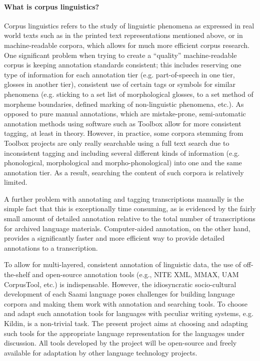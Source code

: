 \documentclass[a4paper,12pt]{article}
\begin{document}
\paragraph{What is corpus linguistics?} Corpus linguistics refers to the study of linguistic phenomena as expressed in real world texts such as in the printed text representations mentioned above, or in machine-readable corpora, which allows for much more efficient corpus research. One significant problem when trying to create a “quality” machine-readable corpus is keeping annotation standards consistent; this includes reserving one type of information for each annotation tier (e.g. part-of-speech in one tier, glosses in another tier), consistent use of certain tags or symbols for similar phenomena (e.g. sticking to a set list of morphological glosses, to a set method of morpheme boundaries, defined marking of non-linguistic phenomena, etc.). As opposed to pure manual annotations, which are mistake-prone, semi-automatic annotation methods using software such as Toolbox allow for more consistent tagging, at least in theory. However, in practice, some corpora stemming from Toolbox projects are only really searchable using a full text search due to inconsistent tagging and including several different kinds of information (e.g. phonological, morphological and morpho-phonological) into one and the same annotation tier. As a result, searching the content of such corpora is relatively limited.

A further problem with annotating and tagging transcriptions manually is the simple fact that this is exceptionally time consuming, as is evidenced by the fairly small amount of detailed annotation relative to the total number of transcriptions for archived language materials. %
Computer-aided annotation, on the other hand, provides a significantly faster and more efficient way to provide detailed annotations to a transcription.

To allow for multi-layered, consistent annotation of linguistic data, the use of off-the-shelf and open-source annotation tools (e.g., NITE XML, MMAX, UAM CorpusTool, %
etc.) is indispensable. However, the idiosyncratic socio-cultural development of each Saami language poses challenges for building language corpora and making them work with annotation and searching tools. To choose and adapt such annotation tools for languages with peculiar writing systems, e.g. Kildin, is a non-trivial task. The present project aims at choosing and adapting such tools for the appropriate language representation for the languages under discussion. All tools developed by the project will be open-source and freely available for adaptation by other language technology projects. %
\end{document}
